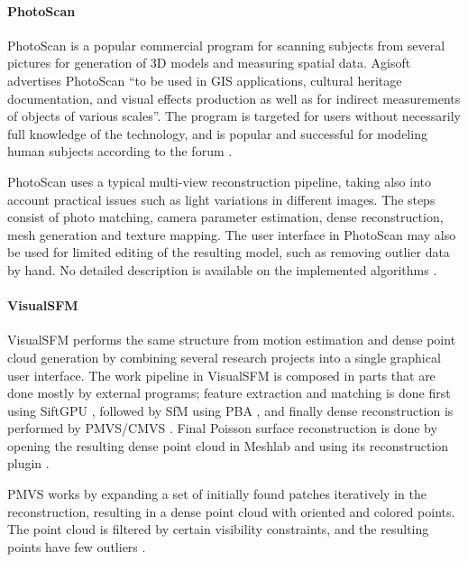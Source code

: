 \paragraph{PhotoScan}
PhotoScan \cite{photoscan} is a popular commercial program for scanning subjects from several pictures for generation of 3D models and measuring spatial data.
Agisoft advertises PhotoScan ``to be used in GIS applications, cultural heritage documentation, and visual effects production as well as for indirect measurements of objects of various scales''.
The program is targeted for users without necessarily full knowledge of the technology, and is popular and successful for modeling human subjects according to the forum \cite{agisoftforum}.

PhotoScan uses a typical multi-view reconstruction pipeline, taking also into account practical issues such as light variations in different images.
The steps consist of photo matching, camera parameter estimation, dense reconstruction, mesh generation and texture mapping.
The user interface in PhotoScan may also be used for limited editing of the resulting model, such as removing outlier data by hand.
No detailed description is available on the implemented algorithms \cite{photoscanalgorithms}.

\paragraph{VisualSFM}
VisualSFM \cite{wu2013towards} performs the same structure from motion estimation and dense point cloud generation by combining several research projects into a single graphical user interface.
The work pipeline in VisualSFM is composed in parts that are done mostly by external programs; feature extraction and matching is done first using SiftGPU \cite{changchang2007siftgpu}, followed by SfM using PBA \cite{wu2011multicore}, and finally dense reconstruction is performed by PMVS/CMVS \cite{furukawa2010accurate,furukawa2012patch}.
Final Poisson surface reconstruction is done by opening the resulting dense point cloud in Meshlab and using its reconstruction plugin \cite{meshlab}.

PMVS works by expanding a set of initially found patches iteratively in the reconstruction, resulting in a dense point cloud with oriented and colored points.
The point cloud is filtered by certain visibility constraints, and the resulting points have few outliers \cite{furukawa2012patch}.


